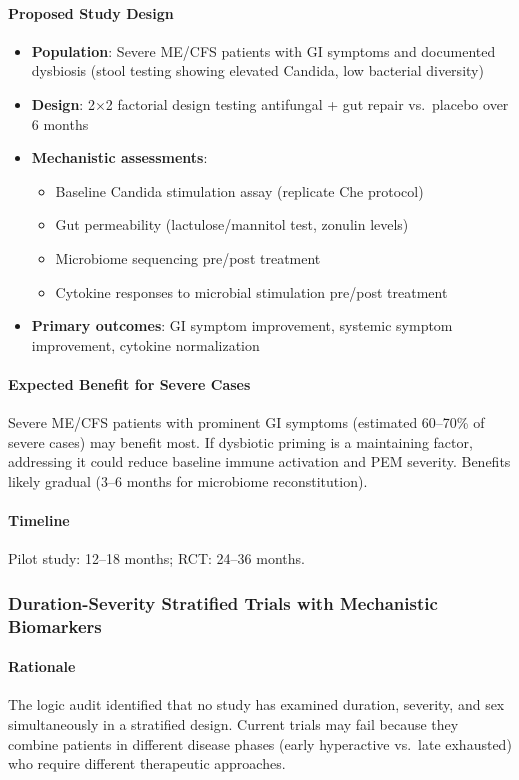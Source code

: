 \paragraph{Proposed Study Design}
\begin{itemize}
    \item \textbf{Population}: Severe ME/CFS patients with GI symptoms and documented dysbiosis (stool testing showing elevated Candida, low bacterial diversity)
    \item \textbf{Design}: 2$\times$2 factorial design testing antifungal + gut repair vs.\ placebo over 6 months
    \item \textbf{Mechanistic assessments}:
    \begin{itemize}
        \item Baseline Candida stimulation assay (replicate Che protocol)
        \item Gut permeability (lactulose/mannitol test, zonulin levels)
        \item Microbiome sequencing pre/post treatment
        \item Cytokine responses to microbial stimulation pre/post treatment
    \end{itemize}
    \item \textbf{Primary outcomes}: GI symptom improvement, systemic symptom improvement, cytokine normalization
\end{itemize}

\paragraph{Expected Benefit for Severe Cases}
Severe ME/CFS patients with prominent GI symptoms (estimated 60--70\% of severe cases) may benefit most. If dysbiotic priming is a maintaining factor, addressing it could reduce baseline immune activation and PEM severity. Benefits likely gradual (3--6 months for microbiome reconstitution).

\paragraph{Timeline}
Pilot study: 12--18 months; RCT: 24--36 months.

\subsubsection{Duration-Severity Stratified Trials with Mechanistic Biomarkers}

\paragraph{Rationale}
The logic audit identified that no study has examined duration, severity, and sex simultaneously in a stratified design. Current trials may fail because they combine patients in different disease phases (early hyperactive vs.\ late exhausted) who require different therapeutic approaches.


